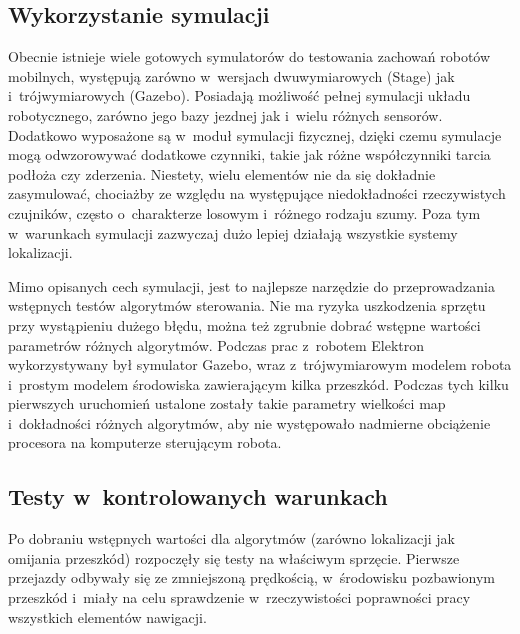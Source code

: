 \subsection{Wykorzystanie symulacji}

Obecnie istnieje wiele gotowych symulatorów do testowania zachowań robotów
mobilnych, występują zarówno w~wersjach dwuwymiarowych (Stage) jak i~trójwymiarowych
(Gazebo). Posiadają możliwość pełnej symulacji układu robotycznego, zarówno
jego bazy jezdnej jak i~wielu różnych sensorów. Dodatkowo wyposażone są 
w~moduł symulacji fizycznej, dzięki czemu symulacje mogą odwzorowywać dodatkowe
czynniki, takie jak różne współczynniki tarcia podłoża czy zderzenia. 
Niestety, wielu elementów nie da się dokładnie zasymulować, chociażby ze
względu na występujące niedokładności rzeczywistych czujników, często o~charakterze
losowym i~różnego rodzaju szumy. Poza tym w~warunkach symulacji zazwyczaj dużo
lepiej działają wszystkie systemy lokalizacji. 

Mimo opisanych cech symulacji, jest to najlepsze narzędzie do przeprowadzania
wstępnych testów algorytmów sterowania. Nie ma ryzyka uszkodzenia sprzętu
przy wystąpieniu dużego błędu, można też zgrubnie dobrać wstępne wartości
parametrów różnych algorytmów. Podczas prac z~robotem Elektron wykorzystywany
był symulator Gazebo, wraz z~trójwymiarowym modelem robota i~prostym modelem
środowiska zawierającym kilka przeszkód. Podczas tych kilku pierwszych uruchomień
ustalone zostały takie parametry wielkości map i~dokładności różnych algorytmów,
aby nie występowało nadmierne obciążenie procesora na komputerze sterującym
robota.

\subsection{Testy w~kontrolowanych warunkach}

Po dobraniu wstępnych wartości dla algorytmów (zarówno lokalizacji jak 
omijania przeszkód) rozpoczęły się testy na właściwym sprzęcie. Pierwsze 
przejazdy odbywały się ze zmniejszoną prędkością, w~środowisku pozbawionym
przeszkód i~miały na celu sprawdzenie w~rzeczywistości poprawności pracy
wszystkich elementów nawigacji.

